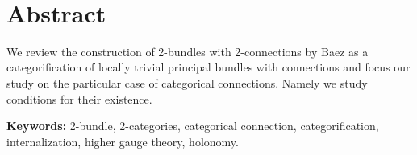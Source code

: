 \parbox[t][2cm][c]{\textwidth}{~\vfill}
\section*{Abstract}

We review the construction of 2-bundles with 2-connections by Baez as a categorification of locally trivial principal bundles with connections and focus our study on the particular case of categorical connections. Namely we study conditions for their existence.

\vfill
\textbf{\Large Keywords:} 2-bundle, 2-categories, categorical connection, categorification, internalization, higher gauge theory, holonomy.
